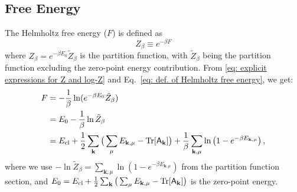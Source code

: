 \documentclass[aps, prx, nofootinbib, superscriptaddress]{revtex4-2}
\newcommand{\kvec}{\mathbf{k}}
\newcommand{\Tr}{\mathrm{Tr}}
\begin{document}
\subsection{Free Energy}\label{subsec: Free Energy}
The Helmholtz free energy ($F$) is defined as 
\begin{equation}\label{eq: def. of Helmholtz free energy}
    Z_{\beta} \equiv e^{-\beta F}
\end{equation}
where $Z_{\beta} = e^{- \beta E_0} \tilde{Z}_{\beta}$ is the partition function, with $\tilde{Z}_{\beta}$ being the partition function excluding the zero-point energy contribution.
From \eqref{eq: explicit expressions for Z and log-Z} and Eq.~\eqref{eq: def. of Helmholtz free energy}, we get:
\begin{align}
    F &= -\frac{1}{\beta} \ln(e^{- \beta E_0} \tilde{Z}_{\beta}) \nonumber \\
    &= E_0 - \frac{1}{\beta} \ln \tilde{Z}_{\beta} \nonumber \\
    &= E_{\rm cl} + \frac{1}{2} \sum_{\kvec} \big( \sum_{\mu} E_{\kvec, \mu} - \Tr [\mathsf{A}_{\kvec}] \big) + \frac{1}{\beta} \sum_{\kvec, \mu} \ln \left( 1 - e^{-\beta E_{\kvec, \mu}} \right),
\end{align}
where we use $-\ln \tilde{Z}_{\beta} = \sum_{\kvec, \mu} \ln \left( 1 - e^{-\beta E_{\kvec, \mu}} \right)$ from the partition function section, and $E_0 = E_{\rm cl} + \frac{1}{2} \sum_{\kvec} \big( \sum_{\mu} E_{\kvec, \mu} - \Tr [\mathsf{A}_{\kvec}] \big)$ is the zero-point energy.
\end{document}
